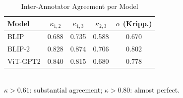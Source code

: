 
\begin{table}[!t]
\renewcommand{\arraystretch}{1.2}
\caption{Inter-Annotator Agreement per Model}
\label{tab:iaa}
\centering
\begin{tabular}{lcccc}
\hline
\textbf{Model} & $\kappa_{1,2}$ & $\kappa_{1,3}$ & $\kappa_{2,3}$ & $\alpha$ (Kripp.) \\
\hline
BLIP & 0.688 & 0.735 & 0.588 & 0.670 \\
BLIP-2 & 0.828 & 0.874 & 0.706 & 0.802 \\
ViT-GPT2 & 0.840 & 0.815 & 0.680 & 0.778 \\
\hline
\end{tabular}
\\
\small $\kappa > 0.61$: substantial agreement; $\kappa > 0.80$: almost perfect.
\end{table}
